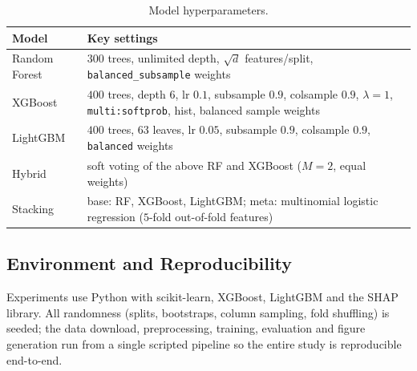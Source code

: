 \documentclass[conference]{IEEEtran}
\begin{document}
\begin{table}[t]
\caption{Model hyperparameters.}
\label{tab:hp}
\centering
\footnotesize
\renewcommand{\arraystretch}{1.2}
\begin{tabular}{p{1.7cm}p{6cm}}
\toprule
\textbf{Model} & \textbf{Key settings} \\
\midrule
Random Forest & $300$ trees, unlimited depth, $\sqrt{d}$ features/split,
\texttt{balanced\_subsample} weights \\
XGBoost & $400$ trees, depth $6$, lr $0.1$, subsample $0.9$, colsample $0.9$,
$\lambda{=}1$, \texttt{multi:softprob}, hist, balanced sample weights \\
LightGBM & $400$ trees, $63$ leaves, lr $0.05$, subsample $0.9$, colsample $0.9$,
\texttt{balanced} weights \\
Hybrid & soft voting of the above RF and XGBoost ($M{=}2$, equal weights) \\
Stacking & base: RF, XGBoost, LightGBM; meta: multinomial logistic regression
($5$-fold out-of-fold features) \\
\bottomrule
\end{tabular}
\end{table}

\subsection{Environment and Reproducibility}
Experiments use Python with scikit-learn, XGBoost, LightGBM and the SHAP library.
All randomness (splits, bootstraps, column sampling, fold shuffling) is seeded;
the data download, preprocessing, training, evaluation and figure generation run
from a single scripted pipeline so the entire study is reproducible end-to-end.
\end{document}
